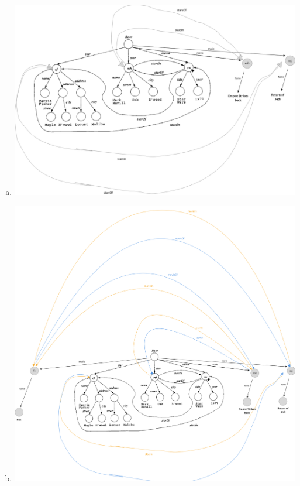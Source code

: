 \documentclass[12pt]{article}
\begin{document}
\begin{enumerate}[1.]
\begin{enumerate}[a)]
\begin{itemize}
\begin{itemize}
            \end{itemize}

            \item
        \end{itemize}

        \item

    \begin{center}
    \includegraphics[width=\linewidth]{images/worksheet_9_solution_5.png}
    \end{center}


        \item

    \begin{center}
    \includegraphics[width=\linewidth]{images/worksheet_9_solution_6.png}
    \end{center}


\end{enumerate}
\end{enumerate}
\end{document}
